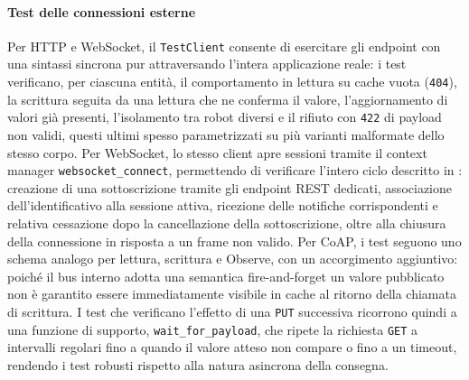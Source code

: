 \paragraph{Test delle connessioni esterne}
Per \ac{HTTP} e WebSocket, il \texttt{TestClient} consente di esercitare gli endpoint con una sintassi sincrona pur attraversando l'intera applicazione reale: i test verificano, per ciascuna entità, il comportamento in lettura su cache vuota (\texttt{404}), la scrittura seguita da una lettura che ne conferma il valore, l'aggiornamento di valori già presenti, l'isolamento tra robot diversi e il rifiuto con \texttt{422} di payload non validi, questi ultimi spesso parametrizzati su più varianti malformate dello stesso corpo. Per WebSocket, lo stesso client apre sessioni tramite il context manager \texttt{websocket\_connect}, permettendo di verificare l'intero ciclo descritto in : creazione di una sottoscrizione tramite gli endpoint \ac{REST} dedicati, associazione dell'identificativo alla sessione attiva, ricezione delle notifiche corrispondenti e relativa cessazione dopo la cancellazione della sottoscrizione, oltre alla chiusura della connessione in risposta a un frame non valido. Per \ac{CoAP}, i test seguono uno schema analogo per lettura, scrittura e Observe, con un accorgimento aggiuntivo: poiché il bus interno adotta una semantica fire-and-forget un valore pubblicato non è garantito essere immediatamente visibile in cache al ritorno della chiamata di scrittura. I test che verificano l'effetto di una \texttt{PUT} successiva ricorrono quindi a una funzione di supporto, \texttt{wait\_for\_payload}, che ripete la richiesta \texttt{GET} a intervalli regolari fino a quando il valore atteso non compare o fino a un timeout, rendendo i test robusti rispetto alla natura asincrona della consegna.

